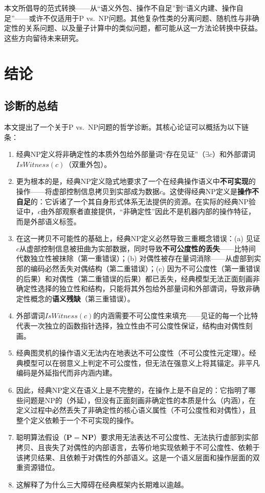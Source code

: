 \documentclass{ctexart}
\begin{document}
	本文所倡导的范式转换——从``语义外包、操作不自足''到``语义内建、操作自足''——或许不仅适用于P vs.\ NP问题。其他复杂性类的分离问题、随机性与非确定性的关系问题、以及量子计算中的类似问题，都可能从这一方法论转换中获益。这些方向留待未来研究。
	
	\section{结论}
	
	\subsection{诊断的总结}
	
	本文提出了一个关于P vs.\ NP问题的哲学诊断。其核心论证可以概括为以下链条：
	
	\begin{enumerate}
		\item 经典NP定义将非确定性的本质外包给外部量词``存在见证''（$\exists c$）和外部谓词$IsWitness(c)$（双重外包）。
		\item 更为根本的是，经典NP定义隐式地要求了一个在经典操作语义中\textbf{不可实现}的操作——将虚部控制信息拷贝到实部成为数据$c$。这使得经典NP定义是\textbf{操作不自足}的：它诉诸了一个其自身形式体系无法提供的资源。在实际的经典NP验证中，$c$由外部观察者直接提供，``非确定性''因此不是机器内部的操作特征，而是外部语义标签。
		\item 在这一拷贝不可能性的基础上，经典NP定义必然导致三重概念错误：(a) 见证$c$从虚部控制信息被扭曲为实部数据，同时导致\textbf{不可公度性的丢失}——比特间代数独立性被抹除（第一重错误）；(b) 对偶性被存在量词消除——从虚部到实部的编码必然丢失对偶结构（第二重错误）；(c) 因为不可公度性（第一重错误的后果）和对偶性（第二重错误的后果）都已丢失，经典模型无法正面刻画非确定性选择的独立性和结构，只能将其外包给外部量词和外部谓词，导致非确定性概念的\textbf{语义残缺}（第三重错误）。
		\item 外部谓词$IsWitness(c)$的内涵需要不可公度性来填充——见证的每一个比特代表一次独立的函数指针选择，独立性由不可公度性保证，结构由对偶性刻画。
		\item 经典图灵机的操作语义无法内在地表达不可公度性（不可公度性元定理）。经典模型可以在弱意义上判定不可公度性，但无法在强意义上将其锚定。非平凡编码是外延指代而非内涵内建。
		\item 因此，经典NP定义在语义上是不完整的，在操作上是不自足的：它指明了哪些问题是NP的（外延），但没有正面刻画非确定性的本质是什么（内涵），在定义过程中必然丢失了非确定性的核心语义属性（不可公度性和对偶性），且整个定义依赖于一个不可实现的操作。
		\item 聪明算法假设（$\mathbf{P}=\mathbf{NP}$）要求用无法表达不可公度性、无法执行虚部到实部拷贝、且丧失了对偶性的内部语言，去等价地实现依赖于不可公度性、依赖于该拷贝结果、且依赖于对偶性的外部语义。这是一个语义层面和操作层面的双重资源错位。
		\item 这解释了为什么三大障碍在经典框架内长期难以逾越。
	\end{enumerate}
	
\end{document}
